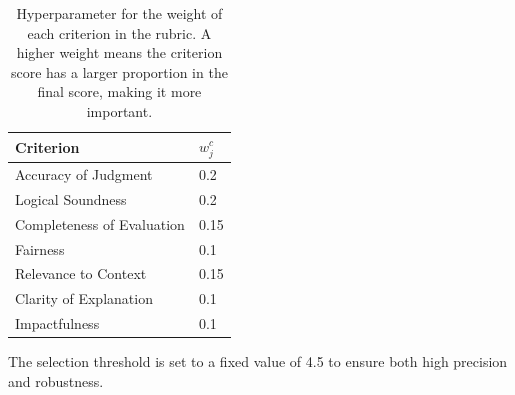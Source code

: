 \documentclass{article}
\theoremstyle{plain}
\theoremstyle{definition}
\theoremstyle{remark}
\begin{document}
\begin{table}[ht]
\centering
\setlength{\tabcolsep}{13pt}
\begin{tabular}{ll}
\toprule
\textbf{Criterion} &\textbf{$w_{j}^{c}$}  \\
\midrule
Accuracy of Judgment &  0.2\\
Logical Soundness  &  0.2\\
Completeness of Evaluation & 0.15 \\
Fairness & 0.1 \\
Relevance to Context & 0.15 \\
Clarity of Explanation & 0.1 \\
Impactfulness & 0.1 \\
\bottomrule
\end{tabular}
\caption{Hyperparameter for the weight of each criterion in the rubric. A higher weight means the criterion score has a larger proportion in the final score, making it more important.}
\label{tb:weight-c}
\end{table}

The selection threshold is set to a fixed value of 4.5 to ensure both high precision and robustness.
\end{document}
